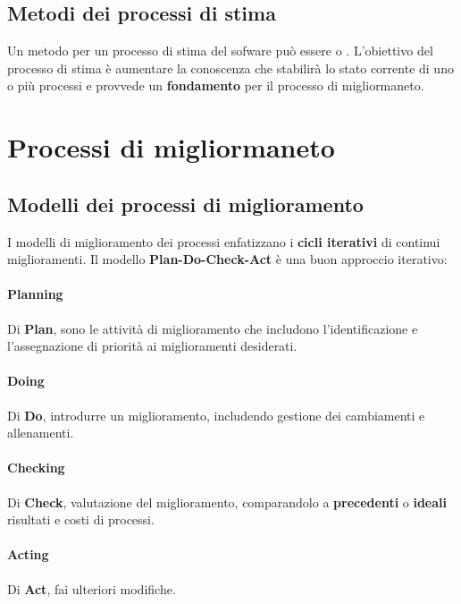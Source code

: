 \subsection{Metodi dei processi di stima}
Un metodo per un processo di stima del sofware pu\`o essere  o . \newline
L'obiettivo del processo di stima \`e aumentare la conoscenza che stabilir\`a lo stato corrente di uno o pi\`u processi e provvede un \textbf{fondamento} per il processo di migliormaneto.

\section{Processi di migliormaneto}
\subsection{Modelli dei processi di miglioramento}
I modelli di miglioramento dei processi enfatizzano i \textbf{cicli iterativi} di continui miglioramenti. \newline
Il modello \textbf{Plan-Do-Check-Act} \`e una buon approccio iterativo:
\paragraph{Planning}
Di \textbf{Plan}, sono le attivit\`a di miglioramento che includono l'identificazione e l'assegnazione di priorit\`a ai miglioramenti desiderati.
\paragraph{Doing}
Di \textbf{Do}, introdurre un miglioramento, includendo gestione dei cambiamenti e allenamenti.
\paragraph{Checking}
Di \textbf{Check}, valutazione del miglioramento, comparandolo a \textbf{precedenti} o \textbf{ideali} risultati e costi di processi.
\paragraph{Acting}
Di \textbf{Act}, fai ulteriori modifiche.


